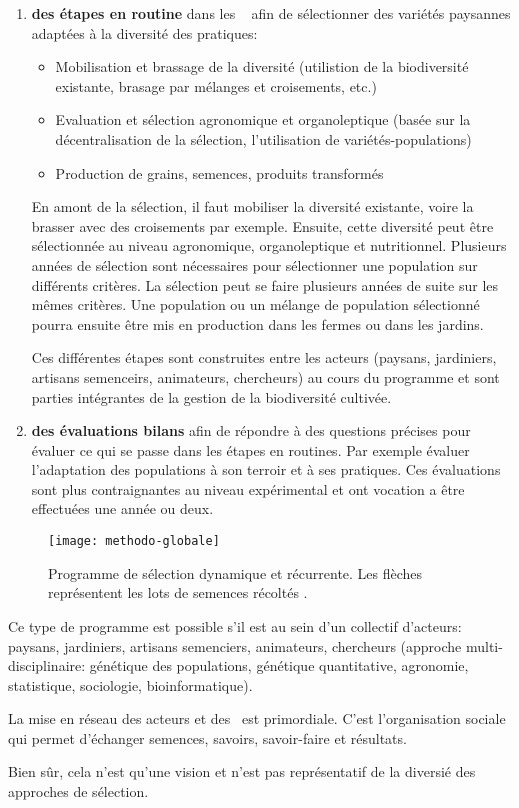 \begin{enumerate}

\item \textbf{\color{mln-green} des étapes en routine} dans les \MSPs~ afin de sélectionner des variétés paysannes adaptées à la diversité des pratiques:

\begin{itemize}
\item Mobilisation et brassage de la diversité (utilistion de la biodiversité existante, brasage par mélanges et croisements, etc.)
\item Evaluation et sélection agronomique et organoleptique (basée sur la décentralisation de la sélection, l'utilisation de variétés-populations)
\item Production de grains, semences, produits transformés
\end{itemize}

En amont de la sélection, il faut mobiliser la diversité existante, voire la brasser avec des croisements par exemple.
Ensuite, cette diversité peut être sélectionnée au niveau agronomique, organoleptique et nutritionnel. 
Plusieurs années de sélection sont nécessaires pour sélectionner une population sur différents critères.
La sélection peut se faire plusieurs années de suite sur les mêmes critères.
Une population ou un mélange de population sélectionné pourra ensuite être mis en production dans les fermes ou dans les jardins.

Ces différentes étapes sont construites entre les acteurs (paysans, jardiniers, artisans semenceirs, animateurs, chercheurs) au cours du programme et sont parties intégrantes de la gestion de la biodiversité cultivée.


\item \textbf{\color{mln-green}des évaluations bilans} afin de répondre à des questions précises pour évaluer ce qui se passe dans les étapes en routines.
Par exemple évaluer l'adaptation des populations à son terroir et à ses pratiques.
Ces évaluations sont plus contraignantes au niveau expérimental et ont vocation a être effectuées une année ou deux.

\end{enumerate}


\begin{figure}[H]
\centering\texttt{[image: methodo-globale]}
\caption{Programme de sélection dynamique et récurrente. Les flèches représentent les lots de semences récoltés \cite{methodo-globale}.}
\label{methodo-globale}
\end{figure}

Ce type de programme est possible s'il est  au sein d'un collectif d'acteurs: paysans, jardiniers, artisans semenciers, animateurs, chercheurs (approche multi-disciplinaire: génétique des populations, génétique quantitative, agronomie, statistique, sociologie, bioinformatique).

La mise en réseau des acteurs et des \MSPs~est primordiale. 
C'est l'organisation sociale qui permet d'échanger semences, savoirs, savoir-faire et résultats.

Bien sûr, cela n'est qu'une vision et n'est pas représentatif de la diversié des approches de sélection.
